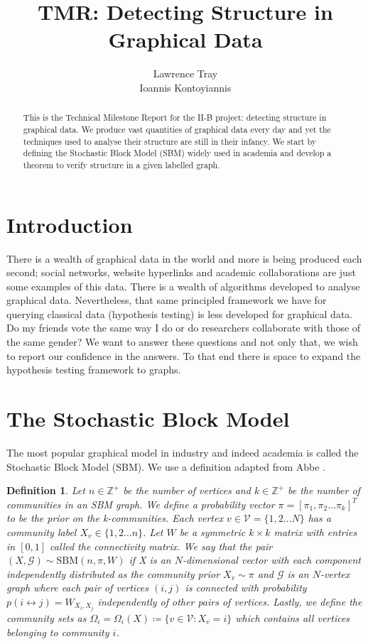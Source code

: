 \documentclass[]{article}
\title{TMR: Detecting Structure in Graphical Data}
\author{Lawrence Tray \\ Ioannis Kontoyiannis}
\newcommand{\Gcal}{\mathcal{G}}
\newcommand{\Vcal}{\mathcal{V}}
\newcommand{\Integers}{\mathbb{Z}}
\newtheorem{definition}{Definition}[section]
\begin{document}
\maketitle

\begin{abstract}
This is the Technical Milestone Report for the II-B project: detecting structure in graphical data. We produce vast quantities of graphical data every day and yet the techniques used to analyse their structure are still in their infancy. We start by defining the Stochastic Block Model (SBM) widely used in academia and develop a theorem to verify structure in a given labelled graph.
\end{abstract}

\tableofcontents

\section{Introduction}

There is a wealth of graphical data in the world and more is being produced each second; social networks, website hyperlinks and academic collaborations are just some examples of this data. There is a wealth of algorithms developed to analyse graphical data. Nevertheless, that same principled framework we have for querying classical data (hypothesis testing) is less developed for graphical data. Do my friends vote the same way I do or do researchers collaborate with those of the same gender? We want to answer these questions and not only that, we wish to report our confidence in the answers. To that end there is space to expand the hypothesis testing framework to graphs.

\section{The Stochastic Block Model}

The most popular graphical model in industry and indeed academia is called the Stochastic Block Model (SBM). We use a definition adapted from Abbe \cite{Abbe}.

\begin{definition}
	\label{defn:sbm}
	Let $n \in \Integers^+$ be the number of vertices and $k \in \Integers^+$ be the number of communities in an SBM graph. We define a probability vector $\pi = [\pi_1, \pi_2 \dots \pi_k]^T$ to be the prior on the k-communities. Each vertex $v \in \Vcal = \{1, 2 \dots N\}$ has a community label $X_v \in \{1, 2 \dots n\}$. Let $W$ be a symmetric $k \times k$ matrix with entries in $[0,1]$ called the connectivity matrix. We say that the pair $(X, \Gcal) \sim \textrm{SBM}(n, \pi, W)$ if X is an $N$-dimensional vector with each component independently distributed as the community prior $X_v \sim \pi$ and $\Gcal$ is an $N$-vertex graph where each pair of vertices $(i, j)$ is connected with probability $p(i \leftrightarrow j) = W_{X_i, X_j}$ independently of other pairs of vertices. Lastly, we define the community sets as $\Omega_i = \Omega_i(X) \coloneqq \{v \in \Vcal : X_v = i\}$ which contains all vertices belonging to community $i$.
\end{definition}
\end{document}
